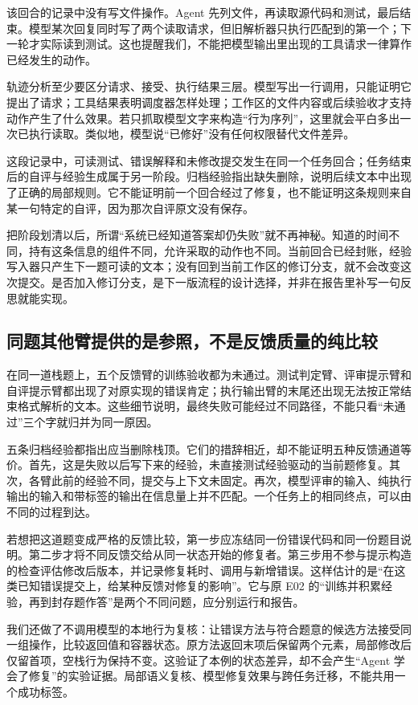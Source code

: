 该回合的记录中没有写文件操作。Agent 先列文件，再读取源代码和测试，最后结束。模型某次回复同时写了两个读取请求，但旧解析器只执行匹配到的第一个；下一轮才实际读到测试。这也提醒我们，不能把模型输出里出现的工具请求一律算作已经发生的动作。

轨迹分析至少要区分请求、接受、执行结果三层。模型写出一行调用，只能证明它提出了请求；工具结果表明调度器怎样处理；工作区的文件内容或后续验收才支持动作产生了什么效果。若只抓取模型文字来构造“行为序列”，这里就会平白多出一次已执行读取。类似地，模型说“已修好”没有任何权限替代文件差异。

这段记录中，可读测试、错误解释和未修改提交发生在同一个任务回合；任务结束后的自评与经验生成属于另一阶段。归档经验指出缺失删除，说明后续文本中出现了正确的局部规则。它不能证明前一个回合经过了修复，也不能证明这条规则来自某一句特定的自评，因为那次自评原文没有保存。

把阶段划清以后，所谓“系统已经知道答案却仍失败”就不再神秘。知道的时间不同，持有这条信息的组件不同，允许采取的动作也不同。当前回合已经封账，经验写入器只产生下一题可读的文本；没有回到当前工作区的修订分支，就不会改变这次提交。是否加入修订分支，是下一版流程的设计选择，并非在报告里补写一句反思就能实现。

\subsection{同题其他臂提供的是参照，不是反馈质量的纯比较}

在同一道栈题上，五个反馈臂的训练验收都为未通过。测试判定臂、评审提示臂和自评提示臂都出现了对原实现的错误肯定；执行输出臂的末尾还出现无法按正常结束格式解析的文本。这些细节说明，最终失败可能经过不同路径，不能只看“未通过”三个字就归并为同一原因。

五条归档经验都指出应当删除栈顶。它们的措辞相近，却不能证明五种反馈通道等价。首先，这是失败以后写下来的经验，未直接测试经验驱动的当前题修复。其次，各臂此前的经验不同，提交与上下文未固定。再次，模型评审的输入、纯执行输出的输入和带标签的输出在信息量上并不匹配。一个任务上的相同终点，可以由不同的过程到达。

若想把这道题变成严格的反馈比较，第一步应冻结同一份错误代码和同一份题目说明。第二步才将不同反馈交给从同一状态开始的修复者。第三步用不参与提示构造的检查评估修改后版本，并记录修复耗时、调用与新增错误。这样估计的是“在这类已知错误提交上，给某种反馈对修复的影响”。它与原 E02 的“训练并积累经验，再到封存题作答”是两个不同问题，应分别运行和报告。

我们还做了不调用模型的本地行为复核：让错误方法与符合题意的候选方法接受同一组操作，比较返回值和容器状态。原方法返回末项后保留两个元素，局部修改后仅留首项，空栈行为保持不变。这验证了本例的状态差异，却不会产生“Agent 学会了修复”的实验证据。局部语义复核、模型修复效果与跨任务迁移，不能共用一个成功标签。

